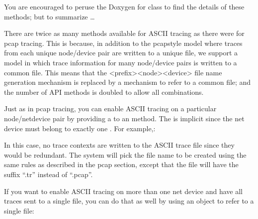 \documentclass[letterpaper,10pt,english]{sphinxmanual}
\renewcommand{\sphinxcode}[1]{\texttt{\small{#1}}}
\begin{document}
You are encouraged to peruse the Doxygen for class \sphinxcode{} to
find the details of these methods; but to summarize …

There are twice as many methods available for ASCII tracing as there were for
pcap tracing. This is because, in addition to the pcap\sphinxhyphen{}style model where traces
from each unique node/device pair are written to a unique file, we support a
model in which trace information for many node/device pairs is written to a
common file.  This means that the \textless{}prefix\textgreater{}\sphinxhyphen{}\textless{}node\textgreater{}\sphinxhyphen{}\textless{}device\textgreater{} file name generation
mechanism is replaced by a mechanism to refer to a common file; and the number
of API methods is doubled to allow all combinations.

Just as in pcap tracing, you can enable ASCII tracing on a particular
node/net\sphinxhyphen{}device pair by providing a \sphinxcode{\sphinxupquote{Ptr\textless{}NetDevice\textgreater{}}} to an \sphinxcode{}
method. The \sphinxcode{} is implicit since the net device must belong to
exactly one \sphinxcode{}. For example,:

\begin{sphinxVerbatim}[commandchars=\\\{\}]
 
  
\end{sphinxVerbatim}

In this case, no trace contexts are written to the ASCII trace file since they
would be redundant. The system will pick the file name to be created using the
same rules as described in the pcap section, except that the file will have the
suffix “.tr” instead of “.pcap”.

If you want to enable ASCII tracing on more than one net device and have all
traces sent to a single file, you can do that as well by using an object to
refer to a single file:

\begin{sphinxVerbatim}[commandchars=\\\{\}]
 
 
    
  
  
\end{sphinxVerbatim}
\end{document}
